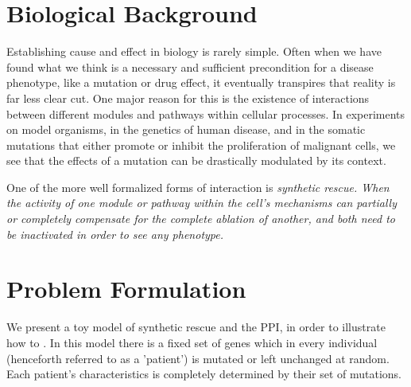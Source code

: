 \documentclass[a4paper,english]{article}
\title{}
\author{}
\date{}
\begin{document}
\maketitle

\section{Biological Background}

Establishing cause and effect in biology is rarely simple. 
Often when we have  found what we think is a necessary and sufficient precondition for a disease phenotype, like a mutation or drug effect, 
it eventually transpires that reality is far less clear cut.
 One major reason for this is the existence of interactions between different modules and pathways within cellular processes. 
In experiments on model organisms, in the genetics of human disease, 
and in the somatic mutations that either promote or inhibit the proliferation of malignant cells, 
we see that the effects of a mutation can be drastically modulated by its context. 


One of the more well formalized forms of interaction is \em{synthetic rescue}.
When the activity of one module or pathway within the cell's mechanisms 
can partially or completely compensate for the complete ablation of another, 
and both need to be inactivated in order to see any phenotype. 





\section{Problem Formulation}





We present a toy model of synthetic rescue and the PPI, in order to illustrate how to .
In this model there is a fixed set of genes which in every individual (henceforth referred to as a 'patient') is mutated or left unchanged at random. 
Each patient's characteristics is completely determined by their set of mutations. 
\end{document}
